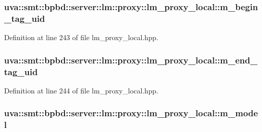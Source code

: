 \subsubsection[{m\+\_\+begin\+\_\+tag\+\_\+uid}]{ uva\+::smt\+::bpbd\+::server\+::lm\+::proxy\+::lm\+\_\+proxy\+\_\+local\+::m\+\_\+begin\+\_\+tag\+\_\+uid\hspace{0.3cm}{\ttfamily [protected]}}\label{classuva_1_1smt_1_1bpbd_1_1server_1_1lm_1_1proxy_1_1lm__proxy__local_adf9f94e10e1d210e35c7716b08b89977}


Definition at line 243 of file lm\+\_\+proxy\+\_\+local.\+hpp.

\hypertarget{classuva_1_1smt_1_1bpbd_1_1server_1_1lm_1_1proxy_1_1lm__proxy__local_a656493c20699367286febb880cbf1ca1}{}
\subsubsection[{m\+\_\+end\+\_\+tag\+\_\+uid}]{ uva\+::smt\+::bpbd\+::server\+::lm\+::proxy\+::lm\+\_\+proxy\+\_\+local\+::m\+\_\+end\+\_\+tag\+\_\+uid\hspace{0.3cm}{\ttfamily [protected]}}\label{classuva_1_1smt_1_1bpbd_1_1server_1_1lm_1_1proxy_1_1lm__proxy__local_a656493c20699367286febb880cbf1ca1}


Definition at line 244 of file lm\+\_\+proxy\+\_\+local.\+hpp.

\hypertarget{classuva_1_1smt_1_1bpbd_1_1server_1_1lm_1_1proxy_1_1lm__proxy__local_ac9984821921672cd3ee113005d5412dd}{}
\subsubsection[{m\+\_\+model}]{ uva\+::smt\+::bpbd\+::server\+::lm\+::proxy\+::lm\+\_\+proxy\+\_\+local\+::m\+\_\+model\hspace{0.3cm}{\ttfamily [protected]}}\label{classuva_1_1smt_1_1bpbd_1_1server_1_1lm_1_1proxy_1_1lm__proxy__local_ac9984821921672cd3ee113005d5412dd}


